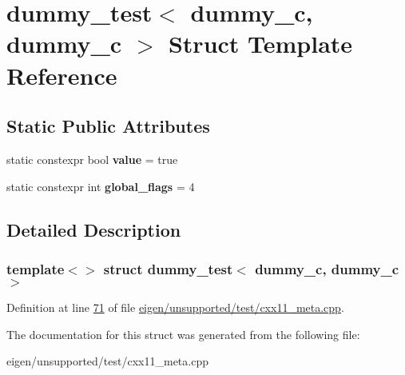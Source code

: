 \hypertarget{structdummy__test_3_01dummy__c_00_01dummy__c_01_4}{}\section{dummy\+\_\+test$<$ dummy\+\_\+c, dummy\+\_\+c $>$ Struct Template Reference}
\label{structdummy__test_3_01dummy__c_00_01dummy__c_01_4}
\subsection*{Static Public Attributes}
\begin{DoxyCompactItemize}
\item 
\mbox{\label{structdummy__test_3_01dummy__c_00_01dummy__c_01_4_ab079eb68b25c68523ba179475cd1c4e0}} 
static constexpr bool {\bfseries value} = true
\item 
\mbox{\label{structdummy__test_3_01dummy__c_00_01dummy__c_01_4_aaca65242011a0f6487406bc4c6899c37}} 
static constexpr int {\bfseries global\+\_\+flags} = 4
\end{DoxyCompactItemize}


\subsection{Detailed Description}
\subsubsection*{template$<$$>$\newline
struct dummy\+\_\+test$<$ dummy\+\_\+c, dummy\+\_\+c $>$}



Definition at line \hyperlink{eigen_2unsupported_2test_2cxx11__meta_8cpp_source_l00071}{71} of file \hyperlink{eigen_2unsupported_2test_2cxx11__meta_8cpp_source}{eigen/unsupported/test/cxx11\+\_\+meta.\+cpp}.



The documentation for this struct was generated from the following file\+:\begin{DoxyCompactItemize}
\item 
eigen/unsupported/test/cxx11\+\_\+meta.\+cpp\end{DoxyCompactItemize}
